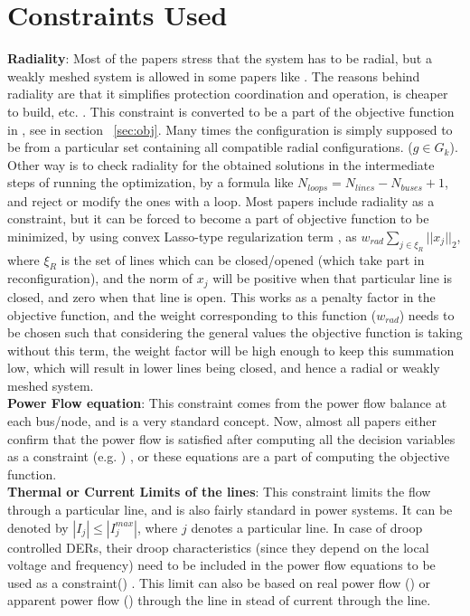 \section{Constraints Used}
\textbf{Radiality}: Most of the papers stress that the system has to be radial, but a weakly meshed system is allowed in some papers like \citep{mgrj02}. The reasons behind radiality are that it simplifies protection coordination and operation, is cheaper to build, etc. \citep{mgrj04}. This constraint is converted to be a part of the objective function in \citep{mgrj02}, see in section ~\ref{sec:obj}. Many times the configuration is simply supposed to be from a particular set containing all compatible radial configurations. ($g\in G_k$). Other way is to check radiality for the obtained solutions in the intermediate steps of running the optimization, by a formula like $N_{loops} = N_{lines}-N_{buses}+1$, and reject or modify the ones with a loop. Most papers include radiality as a constraint, but it can be forced to become a part of objective function to be minimized, by using convex Lasso-type regularization term 
, as $w_{rad}\sum\limits_{j\in\xi_R}||x_j||_2$, where $\xi_R$ is the set of lines which can be closed/opened (which take part in reconfiguration), and the norm of $x_j$ will be positive when that particular line is closed, and zero when that line is open. This works as a penalty factor in the objective function, and the weight corresponding to this function ($w_{rad}$) needs to be chosen such that considering the general values the objective function is taking without this term, the weight factor will be high enough to keep this summation low, which will result in lower lines being closed, and hence a radial or weakly meshed system.\\
\textbf{Power Flow equation}: This constraint comes from the power flow balance at each bus/node, and is a very standard concept. Now, almost all papers either confirm that the power flow is satisfied after computing all the decision variables as a constraint (e.g. \citep{mgrj01}) , or these equations are a part of computing the objective function.\\
\textbf{Thermal or Current Limits of the lines}: This constraint limits the flow through a particular line, and is also fairly standard in power systems. It can be denoted by $|I_j|\le |I_j^{max}|$, where $j$ denotes a particular line. In case of droop controlled DERs, their droop characteristics (since they depend on the local voltage and frequency) need to be included in the power flow equations to be used as a constraint(\citep{mgrj04}) . This limit can also be based on real power flow (\citep{mgrj16}) or apparent power flow (\citep{mgrj29}) through the line in stead of current through the line.\\
